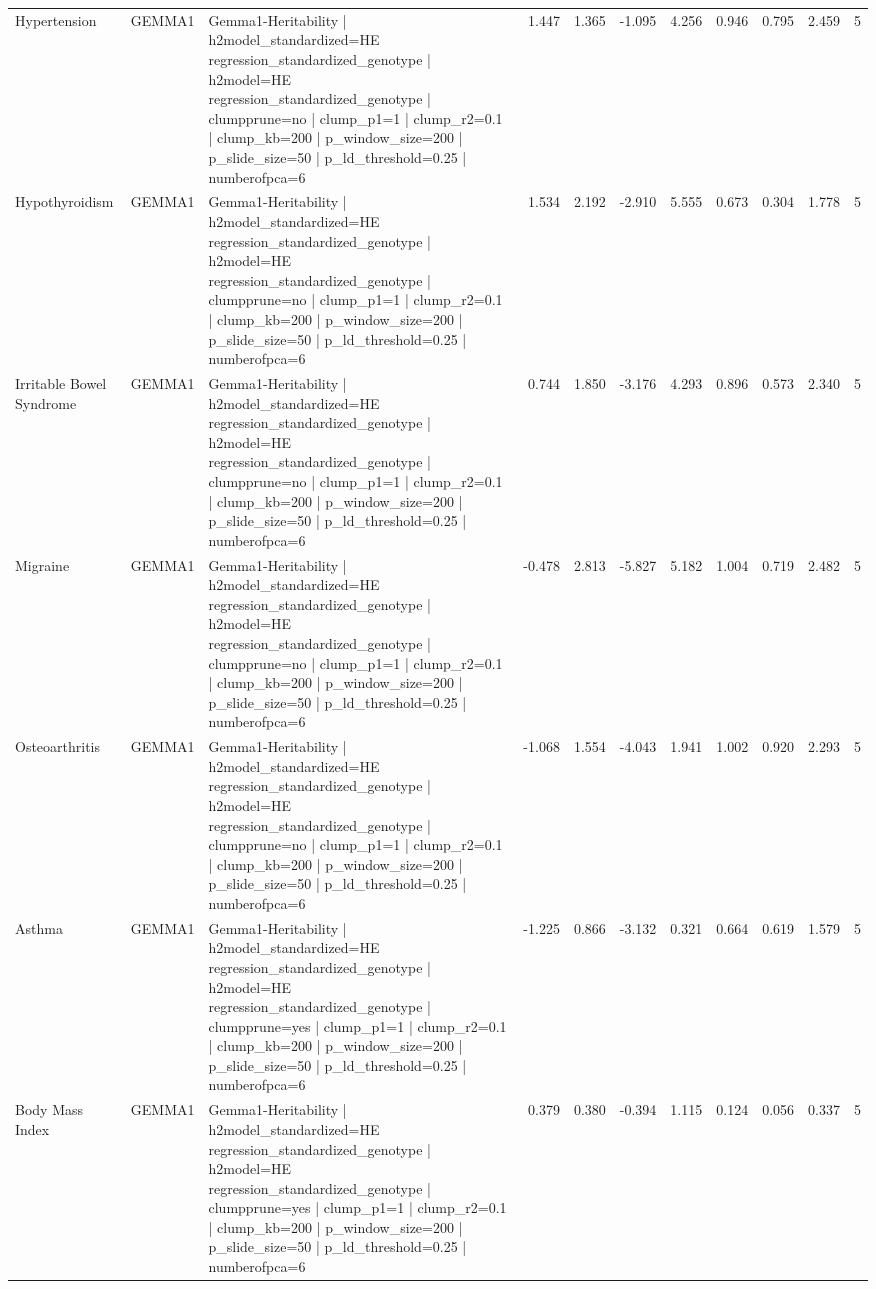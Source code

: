 \begin{landscape}
\begin{longtable}{p{2.4cm}p{1.8cm}p{6.0cm}rrrrrrrr}
Hypertension & GEMMA1 & Gemma1-Heritability | h2model\_standardized=HE regression\_standardized\_genotype | h2model=HE regression\_standardized\_genotype | clumpprune=no | clump\_p1=1 | clump\_r2=0.1 | clump\_kb=200 | p\_window\_size=200 | p\_slide\_size=50 | p\_ld\_threshold=0.25 | numberofpca=6 & 1.447 & 1.365 & -1.095 & 4.256 & 0.946 & 0.795 & 2.459 & 5 \\
Hypothyroidism & GEMMA1 & Gemma1-Heritability | h2model\_standardized=HE regression\_standardized\_genotype | h2model=HE regression\_standardized\_genotype | clumpprune=no | clump\_p1=1 | clump\_r2=0.1 | clump\_kb=200 | p\_window\_size=200 | p\_slide\_size=50 | p\_ld\_threshold=0.25 | numberofpca=6 & 1.534 & 2.192 & -2.910 & 5.555 & 0.673 & 0.304 & 1.778 & 5 \\
Irritable Bowel Syndrome & GEMMA1 & Gemma1-Heritability | h2model\_standardized=HE regression\_standardized\_genotype | h2model=HE regression\_standardized\_genotype | clumpprune=no | clump\_p1=1 | clump\_r2=0.1 | clump\_kb=200 | p\_window\_size=200 | p\_slide\_size=50 | p\_ld\_threshold=0.25 | numberofpca=6 & 0.744 & 1.850 & -3.176 & 4.293 & 0.896 & 0.573 & 2.340 & 5 \\
Migraine & GEMMA1 & Gemma1-Heritability | h2model\_standardized=HE regression\_standardized\_genotype | h2model=HE regression\_standardized\_genotype | clumpprune=no | clump\_p1=1 | clump\_r2=0.1 | clump\_kb=200 | p\_window\_size=200 | p\_slide\_size=50 | p\_ld\_threshold=0.25 | numberofpca=6 & -0.478 & 2.813 & -5.827 & 5.182 & 1.004 & 0.719 & 2.482 & 5 \\
Osteoarthritis & GEMMA1 & Gemma1-Heritability | h2model\_standardized=HE regression\_standardized\_genotype | h2model=HE regression\_standardized\_genotype | clumpprune=no | clump\_p1=1 | clump\_r2=0.1 | clump\_kb=200 | p\_window\_size=200 | p\_slide\_size=50 | p\_ld\_threshold=0.25 | numberofpca=6 & -1.068 & 1.554 & -4.043 & 1.941 & 1.002 & 0.920 & 2.293 & 5 \\
Asthma & GEMMA1 & Gemma1-Heritability | h2model\_standardized=HE regression\_standardized\_genotype | h2model=HE regression\_standardized\_genotype | clumpprune=yes | clump\_p1=1 | clump\_r2=0.1 | clump\_kb=200 | p\_window\_size=200 | p\_slide\_size=50 | p\_ld\_threshold=0.25 | numberofpca=6 & -1.225 & 0.866 & -3.132 & 0.321 & 0.664 & 0.619 & 1.579 & 5 \\
Body Mass Index & GEMMA1 & Gemma1-Heritability | h2model\_standardized=HE regression\_standardized\_genotype | h2model=HE regression\_standardized\_genotype | clumpprune=yes | clump\_p1=1 | clump\_r2=0.1 | clump\_kb=200 | p\_window\_size=200 | p\_slide\_size=50 | p\_ld\_threshold=0.25 | numberofpca=6 & 0.379 & 0.380 & -0.394 & 1.115 & 0.124 & 0.056 & 0.337 & 5 \\

\end{longtable}
\end{landscape}
